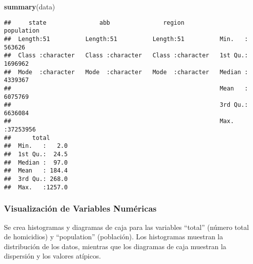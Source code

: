 \documentclass[
]{article}
\newenvironment{Shaded}{\begin{snugshade}}{\end{snugshade}}
\newcommand{\AttributeTok}[1]{\textcolor[rgb]{0.13,0.29,0.53}{#1}}
\newcommand{\DocumentationTok}[1]{\textcolor[rgb]{0.56,0.35,0.01}{\textbf{\textit{#1}}}}
\newcommand{\FunctionTok}[1]{\textcolor[rgb]{0.13,0.29,0.53}{\textbf{#1}}}
\newcommand{\NormalTok}[1]{#1}
\newcommand{\SpecialCharTok}[1]{\textcolor[rgb]{0.81,0.36,0.00}{\textbf{#1}}}
\newcommand{\StringTok}[1]{\textcolor[rgb]{0.31,0.60,0.02}{#1}}
\begin{document}
\begin{Shaded}
\begin{Highlighting}[]
\FunctionTok{summary}\NormalTok{(data)}
\end{Highlighting}
\end{Shaded}

\begin{verbatim}
##     state               abb               region            population      
##  Length:51          Length:51          Length:51          Min.   :  563626  
##  Class :character   Class :character   Class :character   1st Qu.: 1696962  
##  Mode  :character   Mode  :character   Mode  :character   Median : 4339367  
##                                                           Mean   : 6075769  
##                                                           3rd Qu.: 6636084  
##                                                           Max.   :37253956  
##      total       
##  Min.   :   2.0  
##  1st Qu.:  24.5  
##  Median :  97.0  
##  Mean   : 184.4  
##  3rd Qu.: 268.0  
##  Max.   :1257.0
\end{verbatim}

\hypertarget{visualizaciuxf3n-de-variables-numuxe9ricas}{%
\subsubsection{Visualización de Variables
Numéricas}\label{visualizaciuxf3n-de-variables-numuxe9ricas}}

Se crea histogramas y diagramas de caja para las variables ``total''
(número total de homicidios) y ``population'' (población). Los
histogramas muestran la distribución de los datos, mientras que los
diagramas de caja muestran la dispersión y los valores atípicos.

\begin{Shaded}
\end{Shaded}
\end{document}
